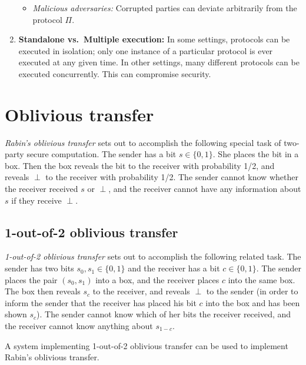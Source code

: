 \begin{enumerate}
\begin{itemize}
      \item \emph{Malicious adversaries:} Corrupted parties can deviate arbitrarily
        from the protocol $\Pi$.
    \end{itemize}

  \item \textbf{Standalone vs.\ Multiple execution:} In some settings, protocols
    can be executed in isolation; only one instance of a particular protocol
    is ever executed at any given time. In other settings, many different protocols
    can be executed concurrently. This can compromise security.
\end{enumerate}







\section{Oblivious transfer}

\emph{Rabin's oblivious transfer} sets out to accomplish the following special task of two-party secure computation. The sender has a bit $s \in \{0,1\}$. She places the bit in a box. Then the box reveals the bit to the receiver with probability 1/2, and reveals $\perp$ to the receiver with probability 1/2. The sender cannot know whether the receiver received $s$ or $\perp$, and the receiver cannot have any information about $s$ if they receive $\perp$.

\subsection{1-out-of-2 oblivious transfer}
\emph{1-out-of-2 oblivious transfer} sets out to accomplish the following related task. The sender has two bits $s_0, s_1 \in \{0,1\}$ and the receiver has a bit $c \in \{0,1\}$. The sender places the pair $(s_0, s_1)$ into a box, and the receiver places $c$ into the same box. The box then reveals $s_c$ to the receiver, and reveals $\perp$ to the sender (in order to inform the sender that the receiver has placed his bit $c$ into the box and has been shown $s_c$). The sender cannot know which of her bits the receiver received, and the receiver cannot know anything about $s_{1-c}$.

\begin{lemma}
A system implementing 1-out-of-2 oblivious transfer can be used to implement Rabin's oblivious transfer.
\end{lemma}

